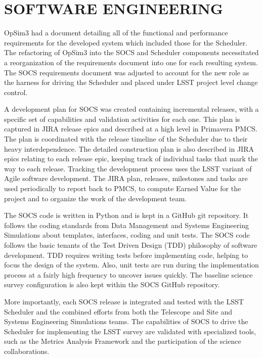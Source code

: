 \documentclass[]{spie}  %
\begin{document}
\section{SOFTWARE ENGINEERING}

OpSim3 had a document detailing all of the functional and performance requirements for the developed system which included those for the Scheduler. The refactoring of OpSim3 into the SOCS and Scheduler components necessitated a reorganization of the requirements document into one for each resulting system. The SOCS requirements document was adjusted to account for the new role as the harness for driving the Scheduler and placed under LSST project level change control.

A development plan for SOCS was created containing incremental releases, with a specific set of capabilities and validation activities for each one. This plan is captured in JIRA\cite{JIRA} release epics and described at a high level in Primavera\cite{Primavera} PMCS\cite{PMCS}. The plan is coordinated with the release timeline of the Scheduler due to their heavy interdependence. The detailed construction plan is also described in JIRA epics relating to each release epic, keeping track of individual tasks that mark the way to each release. Tracking the development process uses the LSST variant of Agile software development\cite{Kantor_SPIE2016}. The JIRA plan, releases, milestones and tasks are used periodically to report back to PMCS, to compute Earned Value for the project and to organize the work of the development team.

The SOCS code is written in Python\cite{Python} and is kept in a GitHub\cite{GitHub} git repository. It follows the coding standards\cite{DMPythonStyle} from Data Management and Systems Engineering Simulations about templates, interfaces, coding and unit tests. The SOCS code follows the basic tenants of the Test Driven Design\cite{Beck2002}\cite{Astels2003} (TDD) philosophy of software development. TDD requires writing tests before implementing code, helping to focus the design of the system. Also, unit tests are run during the implementation process at a fairly high frequency to uncover issues quickly. The baseline science survey configuration is also kept within the SOCS GitHub repository. 

More importantly, each SOCS release is integrated and tested with the LSST Scheduler and the combined efforts from both the Telescope and Site and Systems Engineering Simulations teams. The capabilities of SOCS to drive the Scheduler for implementing the LSST survey are validated with specialized tools, such as the Metrics Analysis Framework\cite{2014SPIE.9149E..0BJ} and the participation of the science collaborations.
\end{document}
